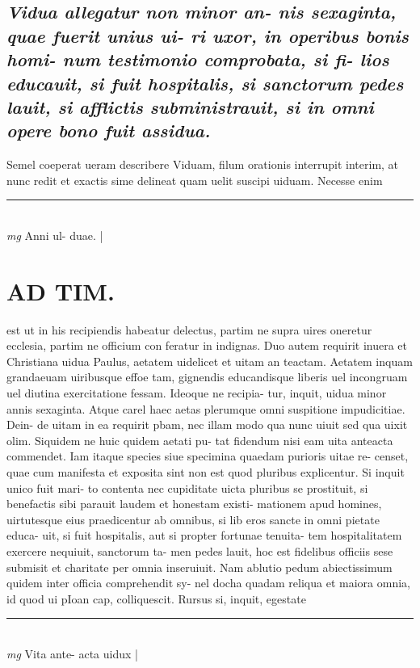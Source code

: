 \documentclass{article}
\begin{document}
\begin{pages}
\subsection*{\textit{Vidua allegatur non minor an- nis sexaginta, quae fuerit unius ui- ri uxor, in operibus bonis homi- num testimonio comprobata, si fi- lios educauit, si fuit hospitalis, si sanctorum pedes lauit, si afflictis subministrauit, si in omni opere bono fuit assidua. }}\pstart Semel coeperat ueram describere Viduam, filum orationis interrupit interim, at nunc redit et exactis sime delineat quam uelit suscipi uiduam. Necesse enim  \pend
\vspace{0.5cm}\noindent
\vspace{0.2cm}\rule{1cm}{0.2pt}\\ 
\hspace{0.2cm}\textit{mg}
\footnotesize Anni ul- duae. 
\normalsize| 
\section*{AD TIM. }
\marginpar{[ p.152 ]}\pstart est ut in his recipiendis habeatur delectus, partim ne supra uires oneretur ecclesia, partim ne officium con feratur in indignas. Duo autem requirit inuera et Christiana uidua Paulus, aetatem uidelicet et uitam an teactam. Aetatem inquam grandaeuam uiribusque effoe tam, gignendis educandisque liberis uel incongruam uel diutina exercitatione fessam. Ideoque ne recipia- tur, inquit, uidua minor annis sexaginta. Atque carel haec aetas plerumque omni suspitione impudicitiae. Dein- de uitam in ea requirit pbam, nec illam modo qua nunc uiuit sed qua uixit olim. Siquidem ne huic quidem aetati pu- tat fidendum nisi eam uita anteacta commendet. Iam itaque species siue specimina quaedam purioris uitae re- censet, quae cum manifesta et exposita sint non est quod pluribus explicentur. Si inquit unico fuit mari- to contenta nec cupiditate uicta pluribus se prostituit, si benefactis sibi parauit laudem et honestam existi- mationem apud homines, uirtutesque eius praedicentur ab omnibus, si lib eros sancte in omni pietate educa- uit, si fuit hospitalis, aut si propter fortunae tenuita- tem hospitalitatem exercere nequiuit, sanctorum ta- men pedes lauit, hoc est fidelibus officiis sese submisit et charitate per omnia inseruiuit. Nam ablutio pedum abiectissimum quidem inter officia comprehendit sy- nel docha quadam reliqua et maiora omnia, id quod ui pIoan cap, colliquescit. Rursus si, inquit, egestate  \pend
\vspace{0.5cm}\noindent
\vspace{0.2cm}\rule{1cm}{0.2pt}\\ 
\hspace{0.2cm}\textit{mg}
\footnotesize Vita ante- acta uidux 
\normalsize| 

\end{pages}
\end{document}
